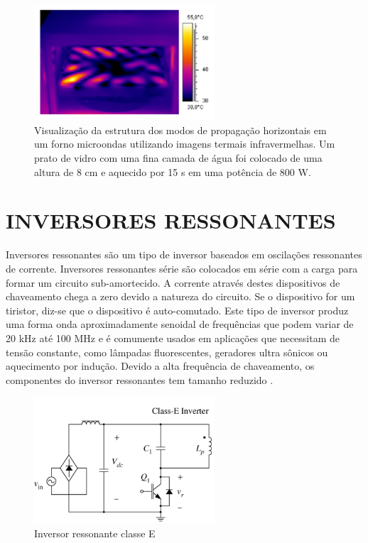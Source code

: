 \begin{figure}[!htb]
    \centering
    \includegraphics[width=0.6\textwidth]{./dados/figuras/micronodes}
    \caption{Visualização da estrutura dos modos de propagação horizontais em um forno microondas utilizando imagens termais infravermelhas. Um prato de vidro com uma fina camada de água foi colocado de uma altura de 8 cm e aquecido por 15 s em uma potência de 800 W.}
    \label{fig:figura-fontferro}
\end{figure}


\section{INVERSORES RESSONANTES}
\label{sec:inverter}

Inversores ressonantes são um tipo de inversor baseados em oscilações ressonantes de corrente.  Inversores ressonantes série são colocados em série com a carga para formar um circuito sub-amortecido. A corrente através destes dispositivos de chaveamento chega a zero devido a natureza do circuito. Se o dispositivo for um tiristor, diz-se que o dispositivo é auto-comutado. 
Este tipo de inversor produz uma forma onda aproximadamente senoidal de frequências que podem variar de 20 kHz até 100 MHz e é comumente usados em aplicações que necessitam de tensão constante, como lâmpadas fluorescentes, geradores ultra sônicos ou aquecimento por indução. Devido a alta frequência de chaveamento, os componentes do inversor ressonantes tem tamanho reduzido \cite{Rashid}.

\begin{figure}[!htb]
    \centering
    \includegraphics[width=0.6\textwidth]{./dados/figuras/inverter}
    \caption{Inversor ressonante classe E}
    \label{fig:figura-fontferro}
\end{figure}



